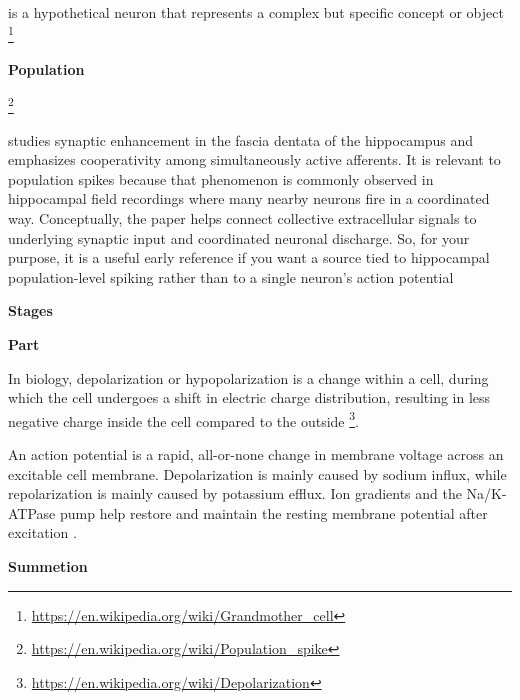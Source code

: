 \documentclass{book}
\providecommand{\ProjectDeepHeading}[2]{%
    \par\medskip\noindent\textbf{#2}\par\smallskip
}
\providecommand{\seeherefooter}[1]{\footnote{\url{#1}}}
\providecommand{\clickurlfooter}[1]{\footnote{\url{#1}}}
\begin{document}

is a hypothetical neuron that represents a complex but specific concept or object \seeherefooter{https://en.wikipedia.org/wiki/Grandmother_cell}

\ProjectDeepHeading{5}{Population}


\clickurlfooter{https://en.wikipedia.org/wiki/Population_spike}
    
    \cite{mcnaughton-1978-synaptic-enhancement-in-fascia-dentata-cooperativity-among-coactive-afferents} studies synaptic enhancement in the fascia dentata of the hippocampus and emphasizes cooperativity among simultaneously active afferents.
    It is relevant to population spikes because that phenomenon is commonly observed in hippocampal field recordings where many nearby neurons fire in a coordinated way.
    Conceptually, the paper helps connect collective extracellular signals to underlying synaptic input and coordinated neuronal discharge.
    So, for your purpose, it is a useful early reference if you want a source tied to hippocampal population-level spiking rather than to a single neuron’s action potential

\ProjectDeepHeading{5}{Stages}

\ProjectDeepHeading{6}{Part}


In biology, depolarization or hypopolarization is a change within a cell, during which the cell undergoes a shift in electric charge distribution, resulting in less negative charge inside the cell compared to the outside \seeherefooter{https://en.wikipedia.org/wiki/Depolarization}.
    
    An action potential is a rapid, all-or-none change in membrane voltage across an excitable cell membrane. Depolarization is mainly caused by sodium influx, while repolarization is mainly caused by potassium efflux. Ion gradients and the Na/K-ATPase pump help restore and maintain the resting membrane potential after excitation \cite{grider-2023-physiology-action-potential}.

\ProjectDeepHeading{5}{Summetion}

\end{document}
